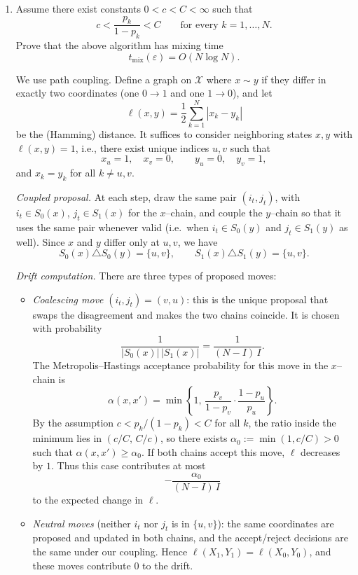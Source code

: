 \documentclass[answers,12pt,addpoints]{exam}
\begin{document}
\begin{enumerate}
  \item Assume there exist constants $0 < c < C < \infty$ such that
  \[
  c < \frac{p_k}{1-p_k} < C
  \qquad\text{for every } k = 1,\dots,N.
  \]
  Prove that the above algorithm has mixing time
  \[
  t_{\mathrm{mix}}(\varepsilon) = O(N \log N).
  \]

  \begin{solution}
We use path coupling. Define a graph on $\mathcal{X}$ where $x \sim y$ if
they differ in exactly two coordinates (one $0 \to 1$ and one $1 \to 0$),
and let
\[
  \ell(x,y) = \frac{1}{2}\sum_{k=1}^N |x_k - y_k|
\]
be the (Hamming) distance. It suffices to consider neighboring states
$x,y$ with $\ell(x,y) = 1$, i.e., there exist unique indices $u,v$ such
that
\[
  x_u = 1,\quad x_v = 0, \qquad y_u = 0,\quad y_v = 1,
\]
and $x_k = y_k$ for all $k \neq u,v$.

\medskip\noindent
\textit{Coupled proposal.}
At each step, draw the same pair $(i_t,j_t)$, with $i_t \in S_0(x)$,
$j_t \in S_1(x)$ for the $x$–chain, and couple the $y$–chain so that it
uses the same pair whenever valid (i.e.\ when $i_t \in S_0(y)$ and
$j_t \in S_1(y)$ as well). Since $x$ and $y$ differ only at $u,v$, we
have
\[
  S_0(x) \triangle S_0(y) = \{u,v\},
  \qquad
  S_1(x) \triangle S_1(y) = \{u,v\}.
\]

\medskip\noindent
\textit{Drift computation.}
There are three types of proposed moves:

\begin{itemize}
\item \emph{Coalescing move} $(i_t,j_t) = (v,u)$: this is the unique
  proposal that swaps the disagreement and makes the two chains
  coincide. It is chosen with probability
  \[
    \frac{1}{|S_0(x)|\,|S_1(x)|} = \frac{1}{(N-I)\,I}.
  \]
  The Metropolis–Hastings acceptance probability for this move in the
  $x$–chain is
  \[
    \alpha(x,x') = \min\!\left\{1,\,
      \frac{p_v}{1-p_v}\cdot\frac{1-p_u}{p_u}
    \right\}.
  \]
  By the assumption $c < p_k/(1-p_k) < C$ for all $k$, the ratio inside
  the minimum lies in $(c/C,\, C/c)$, so there exists
  $\alpha_0 := \min(1,c/C) > 0$ such that $\alpha(x,x') \ge \alpha_0$.
  If both chains accept this move, $\ell$ decreases by $1$. Thus this
  case contributes at most
  \[
    -\frac{\alpha_0}{(N-I)\,I}
  \]
  to the expected change in $\ell$.

\item \emph{Neutral moves} (neither $i_t$ nor $j_t$ is in $\{u,v\}$):
  the same coordinates are proposed and updated in both chains, and the
  accept/reject decisions are the same under our coupling. Hence
  $\ell(X_1,Y_1) = \ell(X_0,Y_0)$, and these moves contribute $0$ to the
  drift.


\end{itemize}
\end{solution}
\end{enumerate}
\end{document}
